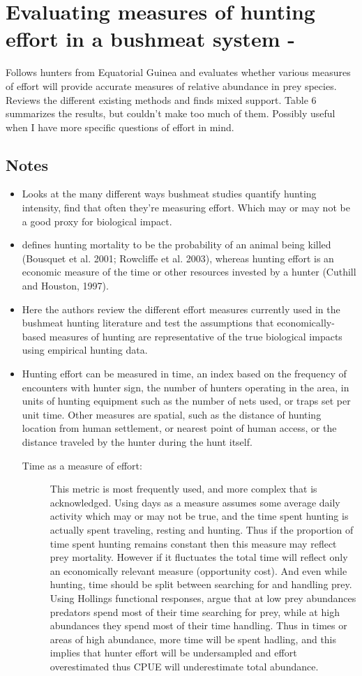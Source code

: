 \documentclass[a4paper,10pt]{report}
\begin{document}
\section*{Evaluating measures of hunting effort in a bushmeat system - \cite{Ristetal:2008}}
Follows hunters from Equatorial Guinea and evaluates whether various measures of effort will provide accurate measures of relative abundance in prey species. Reviews the different existing methods and finds mixed support. Table 6 summarizes the results, but couldn't make too much of them. Possibly useful when I have more specific questions of effort in mind. 
\subsection*{Notes}
\begin{itemize}
\item Looks at the many different ways bushmeat studies quantify hunting intensity, find that often they're measuring effort. Which may or may not be a good proxy for biological impact. 
\item defines hunting mortality to be the probability of an animal being killed (Bousquet et al. 2001; Rowcliffe et al. 2003), whereas hunting effort is an economic measure of the time or other resources invested by a hunter (Cuthill and Houston, 1997). 
\item Here the authors review the different effort measures currently used in the bushmeat hunting literature and test the assumptions that economically-based measures of hunting are representative of the true biological impacts using empirical hunting data. 
\item Hunting effort can be measured in time, an index based on the frequency of encounters with hunter sign, the number of hunters operating in the area, in units of hunting equipment such as the number of nets used, or traps set per unit time. Other measures are spatial, such as the distance of hunting location from human settlement, or nearest point of human access, or the distance traveled by the hunter during the hunt itself. 
\begin{description}
\item[Time as a measure of effort:] This metric is most frequently used, and more complex that is acknowledged. Using days as a measure assumes some average daily activity which may or may not be true, and the time spent hunting is actually spent traveling, resting and hunting. Thus if the  proportion of time spent hunting remains constant then this measure may reflect prey mortality. However if it fluctuates the total time will reflect only an economically relevant measure (opportunity cost).  And even while hunting, time should be split between searching for and handling prey. Using Hollings functional responses, argue that at low prey abundances predators spend most of their time searching for prey, while at high abundances they spend most of their time handling. Thus in times or areas of high abundance, more time will be spent hadling, and this implies that hunter effort will be undersampled and effort overestimated thus CPUE will underestimate total abundance. 

\end{description}
\end{itemize}
\end{document}
